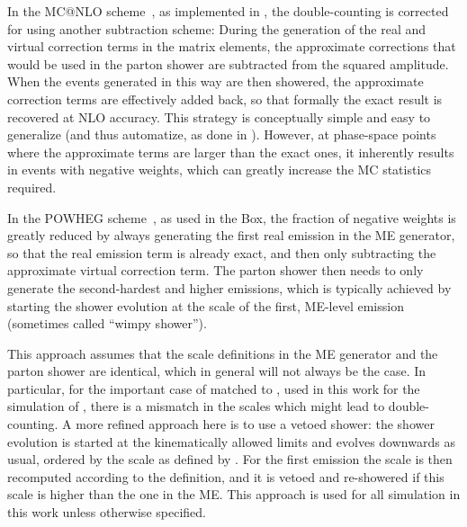 In the MC@NLO scheme~\cite{Frixione:2002ik}, as implemented in \amcatnlo, the double-counting is corrected for using another subtraction scheme: During the generation of the real and virtual correction terms in the matrix elements, the approximate corrections that would be used in the parton shower are subtracted from the squared amplitude. When the events generated in this way are then showered, the approximate correction terms are effectively added back, so that formally the exact result is recovered at NLO accuracy. This strategy is conceptually simple and easy to generalize (and thus automatize, as done in \amcatnlo). However, at phase-space points where the approximate terms are larger than the exact ones, it inherently results in events with negative weights, which can greatly increase the MC statistics required.

In the POWHEG scheme~\cite{Powheg:2004,Powheg:2007}, as used in the \powheg Box, the fraction of negative weights is greatly reduced by always generating the first real emission in the ME generator, so that the real emission term is already exact, and then only subtracting the approximate virtual correction term. The parton shower then needs to only generate the second-hardest and higher emissions, which is typically achieved by starting the shower evolution at the scale of the first, ME-level emission (sometimes called ``wimpy shower'').


This approach assumes that the scale definitions in the ME generator and the parton shower are identical, which in general will not always be the case. In particular, for the important case of \powheg matched to \pythia, used in this work for the simulation of \pptt, there is a mismatch in the scales which might lead to double-counting. A more refined approach here is to use a vetoed shower: the shower evolution is started at the kinematically allowed limits and evolves downwards as usual, ordered by the scale as defined by \pythia. For the first emission the scale is then recomputed according to the \powheg definition, and it is vetoed and re-showered if this scale is higher than the one in the ME. This approach is used for all \pptt simulation in this work unless otherwise specified.

